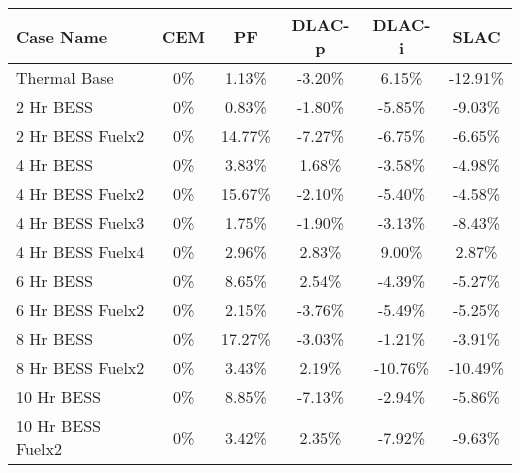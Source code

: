 \begin{tabular}{lccccc}
\toprule
Case Name & CEM & PF & DLAC-p & DLAC-i & SLAC \\
\midrule
Thermal Base & 0\% & 1.13\% & -3.20\% & 6.15\% & -12.91\% \\
2 Hr BESS & 0\% & 0.83\% & -1.80\% & -5.85\% & -9.03\% \\
2 Hr BESS Fuelx2 & 0\% & 14.77\% & -7.27\% & -6.75\% & -6.65\% \\
4 Hr BESS & 0\% & 3.83\% & 1.68\% & -3.58\% & -4.98\% \\
4 Hr BESS Fuelx2 & 0\% & 15.67\% & -2.10\% & -5.40\% & -4.58\% \\
4 Hr BESS Fuelx3 & 0\% & 1.75\% & -1.90\% & -3.13\% & -8.43\% \\
4 Hr BESS Fuelx4 & 0\% & 2.96\% & 2.83\% & 9.00\% & 2.87\% \\
6 Hr BESS & 0\% & 8.65\% & 2.54\% & -4.39\% & -5.27\% \\
6 Hr BESS Fuelx2 & 0\% & 2.15\% & -3.76\% & -5.49\% & -5.25\% \\
8 Hr BESS & 0\% & 17.27\% & -3.03\% & -1.21\% & -3.91\% \\
8 Hr BESS Fuelx2 & 0\% & 3.43\% & 2.19\% & -10.76\% & -10.49\% \\
10 Hr BESS & 0\% & 8.85\% & -7.13\% & -2.94\% & -5.86\% \\
10 Hr BESS Fuelx2 & 0\% & 3.42\% & 2.35\% & -7.92\% & -9.63\% \\
\bottomrule
\end{tabular}
